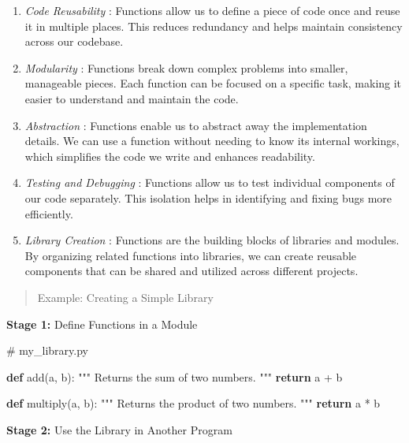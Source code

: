 \documentclass[
  letterpaper,
  DIV=11,
  numbers=noendperiod]{scrreprt}
\newenvironment{Shaded}{\begin{snugshade}}{\end{snugshade}}
\newcommand{\CommentTok}[1]{\textcolor[rgb]{0.37,0.37,0.37}{#1}}
\newcommand{\ControlFlowTok}[1]{\textcolor[rgb]{0.00,0.23,0.31}{\textbf{#1}}}
\newcommand{\KeywordTok}[1]{\textcolor[rgb]{0.00,0.23,0.31}{\textbf{#1}}}
\newcommand{\NormalTok}[1]{\textcolor[rgb]{0.00,0.23,0.31}{#1}}
\newcommand{\OperatorTok}[1]{\textcolor[rgb]{0.37,0.37,0.37}{#1}}
\theoremstyle{plain}
\theoremstyle{definition}
\theoremstyle{remark}
\begin{document}
\begin{enumerate}
\def\labelenumi{\arabic{enumi}.}
\item
  \emph{Code Reusability} : Functions allow us to define a piece of code
  once and reuse it in multiple places. This reduces redundancy and
  helps maintain consistency across our codebase.
\item
  \emph{Modularity} : Functions break down complex problems into
  smaller, manageable pieces. Each function can be focused on a specific
  task, making it easier to understand and maintain the code.
\item
  \emph{Abstraction} : Functions enable us to abstract away the
  implementation details. We can use a function without needing to know
  its internal workings, which simplifies the code we write and enhances
  readability.
\item
  \emph{Testing and Debugging} : Functions allow us to test individual
  components of our code separately. This isolation helps in identifying
  and fixing bugs more efficiently.
\item
  \emph{Library Creation} : Functions are the building blocks of
  libraries and modules. By organizing related functions into libraries,
  we can create reusable components that can be shared and utilized
  across different projects.
\end{enumerate}

\begin{quote}
Example: Creating a Simple Library
\end{quote}

\textbf{Stage 1:} Define Functions in a Module

\begin{Shaded}
\begin{Highlighting}[]
\CommentTok{\# my\_library.py}

\KeywordTok{def}\NormalTok{ add(a, b):}
    \CommentTok{"""}
\CommentTok{    Returns the sum of two numbers.}
\CommentTok{    """}
    \ControlFlowTok{return}\NormalTok{ a }\OperatorTok{+}\NormalTok{ b}

\KeywordTok{def}\NormalTok{ multiply(a, b):}
    \CommentTok{"""}
\CommentTok{    Returns the product of two numbers.}
\CommentTok{    """}
    \ControlFlowTok{return}\NormalTok{ a }\OperatorTok{*}\NormalTok{ b}
\end{Highlighting}
\end{Shaded}

\textbf{Stage 2:} Use the Library in Another Program
\end{document}
